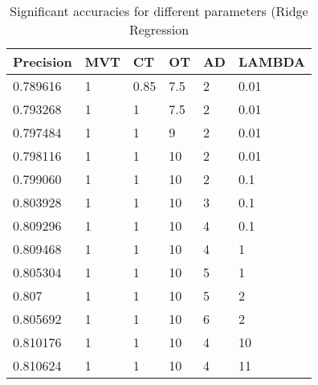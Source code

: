 \documentclass[10pt,conference,compsocconf]{IEEEtran}
\begin{document}
\begin{table}[]
\centering
\begin{tabular}{|l|l|l|l|l|l|}
\hline
Precision                       & MVT & CT                           & OT                          & AD                        & LAMBDA                       \\ \hline
0.789616                        & 1   & \cellcolor[HTML]{FFCCC9}0.85 & 7.5                         & 2                         & 0.01                         \\
0.793268                        & 1   & \cellcolor[HTML]{FFCCC9}1    & \cellcolor[HTML]{C3DCFF}7.5 & 2                         & 0.01                         \\
0.797484                        & 1   & 1                            & \cellcolor[HTML]{C3DCFF}9   & 2                         & 0.01                         \\
0.798116                        & 1   & 1                            & \cellcolor[HTML]{C3DCFF}10  & 2                         & \cellcolor[HTML]{BFDEBF}0.01 \\
0.799060                        & 1   & 1                            & 10                          & \cellcolor[HTML]{FFFC9E}2 & \cellcolor[HTML]{BFDEBF}0.1  \\
0.803928                        & 1   & 1                            & 10                          & \cellcolor[HTML]{FFFC9E}3 & 0.1                          \\
0.809296                        & 1   & 1                            & 10                          & \cellcolor[HTML]{FFFC9E}4 & \cellcolor[HTML]{FFCCC9}0.1  \\
{\color[HTML]{FE0000} 0.809468} & 1   & 1                            & 10                          & \cellcolor[HTML]{C3DCFF}4 & \cellcolor[HTML]{FFCCC9}1    \\
0.805304                        & 1   & 1                            & 10                          & \cellcolor[HTML]{C3DCFF}5 & \cellcolor[HTML]{BFDEBF}1    \\
0.807                           & 1   & 1                            & 10                          & \cellcolor[HTML]{FFFC9E}5 & \cellcolor[HTML]{BFDEBF}2    \\
0.805692                        & 1   & 1                            & 10                          & \cellcolor[HTML]{FFFC9E}6 & 2                            \\
0.810176                        & 1   & 1                            & 10                          & 4                         & \cellcolor[HTML]{FFCCC9}10   \\
{\color[HTML]{FE0000} 0.810624} & 1   & 1                            & 10                          & 4                         & \cellcolor[HTML]{FFCCC9}11   \\ \hline
\end{tabular}
\caption{Significant accuracies for different parameters (Ridge Regression}
\label{tab:trying-hparams}
\end{table}
\end{document}
